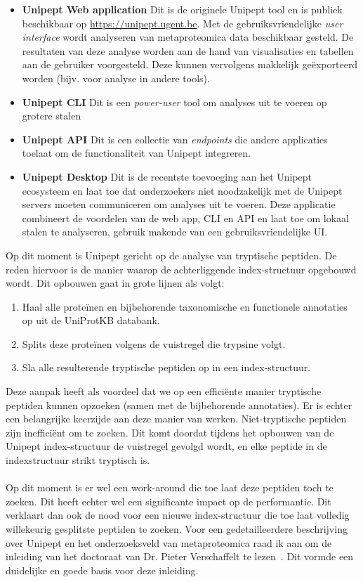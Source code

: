 \begin{itemize}
    \item \textbf{Unipept Web application} Dit is de originele Unipept tool en is publiek beschikbaar op \url{https://unipept.ugent.be}.
    Met de gebruiksvriendelijke \textit{user interface} wordt analyseren van metaproteomica data beschikbaar gesteld.
    De resultaten van deze analyse worden aan de hand van visualisaties en tabellen aan de gebruiker voorgesteld.
    Deze kunnen vervolgens makkelijk geëxporteerd worden (bijv. voor analyse in andere tools).
    \item \textbf{Unipept CLI} Dit is een \textit{power-user} tool om analyses uit te voeren op grotere stalen
    \item \textbf{Unipept API} Dit is een collectie van \textit{endpoints} die andere applicaties toelaat om de functionaliteit van Unipept integreren.
    \item \textbf{Unipept Desktop} Dit is de recentste toevoeging aan het Unipept ecosysteem en laat toe dat onderzoekers niet noodzakelijk met de Unipept servers moeten communiceren om analyses uit te voeren.
    Deze applicatie combineert de voordelen van de web app, CLI en API en laat toe om lokaal stalen te analyseren, gebruik makende van een gebruiksvriendelijke UI\@.

\end{itemize}

Op dit moment is Unipept gericht op de analyse van tryptische peptiden.
De reden hiervoor is de manier waarop de achterliggende index-structuur opgebouwd wordt.
Dit opbouwen gaat in grote lijnen als volgt:

\begin{enumerate}
    \item Haal alle proteïnen en bijbehorende taxonomische en functionele annotaties op uit de UniProtKB databank.
    \item Splits deze proteïnen volgens de vuistregel die trypsine volgt.
    \item Sla alle resulterende tryptische peptiden op in een index-structuur.
\end{enumerate}

Deze aanpak heeft als voordeel dat we op een efficiënte manier tryptische peptiden kunnen opzoeken (samen met de bijbehorende annotaties).
Er is echter een belangrijke keerzijde aan deze manier van werken.
Niet-tryptische peptiden zijn inefficiënt om te zoeken.
Dit komt doordat tijdens het opbouwen van de Unipept index-structuur de vuistregel gevolgd wordt, en elke peptide in de indexstructuur strikt tryptisch is.
\\ \\
Op dit moment is er wel een work-around die toe laat deze peptiden toch te zoeken.
Dit heeft echter wel een significante impact op de performantie.
Dit verklaart dan ook de nood voor een nieuwe index-structuur die toe laat volledig willekeurig gesplitste peptiden te zoeken.
\newline
Voor een gedetailleerdere beschrijving over Unipept en het onderzoeksveld van metaproteomica raad ik aan om de inleiding van het doctoraat van Dr. Pieter Verschaffelt te lezen~\cite{phdPieterUnipept}.
Dit vormde een duidelijke en goede basis voor deze inleiding.


